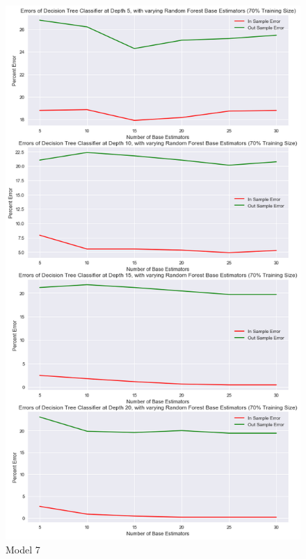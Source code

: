 \documentclass[10pt,twocolumn]{article}
\begin{document}
\begin{figure}[!t]
  \begin{center}
    \includegraphics[width=\textwidth,height=\textheight,keepaspectratio]{randomforest.png}
  \end{center}

  \caption{\small Model 7}
  \label{fig-1}
\end{figure}
\end{document}
